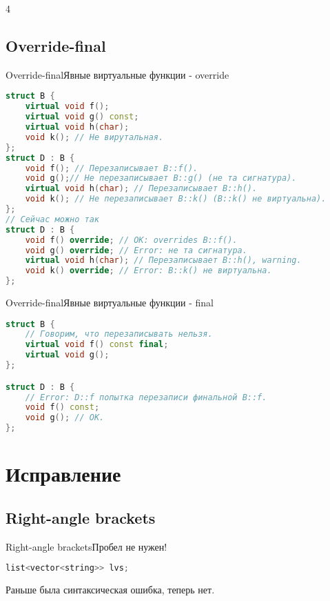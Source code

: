 4\documentclass[10pt]{beamer}
\begin{document}
\subsection{Override-final}
\hypertarget{Override-final}{}
\begin{frame}[fragile]{Override-final}{Явные виртуальные функции - override}
\begin{lstlisting}[language=C++]
struct B {
    virtual void f();
    virtual void g() const;
    virtual void h(char);
    void k(); // Не вирутальная.
};
struct D : B {
    void f(); // Перезаписывает B::f().
    void g();// Не перезаписывает B::g() (не та сигнатура).
    virtual void h(char); // Перезаписывает B::h().
    void k(); // Не перезаписывает B::k() (B::k() не виртуальна).
};
// Сейчас можно так
struct D : B {
    void f() override; // OK: overrides B::f().
    void g() override; // Error: не та сигнатура.
    virtual void h(char); // Перезаписывает B::h(), warning.
    void k() override; // Error: B::k() не виртуальна.
};
\end{lstlisting}
\end{frame}
\begin{frame}[fragile]{Override-final}{Явные виртуальные функции - final}
\begin{lstlisting}[language=C++]
struct B {
    // Говорим, что перезаписывать нельзя.
    virtual void f() const final; 
    virtual void g();
};

struct D : B {
    // Error: D::f попытка перезаписи финальной B::f.
    void f() const; 
    void g(); // OK.
};
\end{lstlisting}
\end{frame}



\section{Исправление}

\subsection{Right-angle brackets}
\begin{frame}[fragile]{Right-angle brackets}{Пробел не нужен!}
\begin{lstlisting}[language=C++]
list<vector<string>> lvs;
\end{lstlisting}
Раньше была синтаксическая ошибка, теперь нет.
\end{frame}

\appendix
\end{document}
